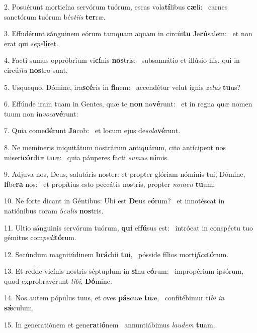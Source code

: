 2. Posuérunt morticína servórum tuórum, escas vola\textbf{tí}libus \textbf{cæ}li: \ast\  carnes sanctórum tuórum bés\textit{ti}\textit{is} \textbf{ter}ræ.\

3. Effudérunt sánguinem eórum tamquam aquam in circúi\textbf{tu} Je\textbf{rú}salem: \ast\  et non erat qui \textit{se}\textit{pe}\textbf{lí}ret.\

4. Facti sumus oppróbrium vi\textbf{cí}nis \textbf{nos}tris: \ast\  subsannátio et illúsio his, qui in circú\textit{i}\textit{tu} \textbf{nos}tro sunt.\

5. Usquequo, Dómine, ira\textbf{scé}ris in \textbf{fi}nem: \ast\  accendétur velut ignis \textit{ze}\textit{lus} \textbf{tu}us?\

6. Effúnde iram tuam in Gentes, quæ te \textbf{non} no\textbf{vé}runt: \ast\  et in regna quæ nomen tuum non in\textit{vo}\textit{ca}\textbf{vé}runt:\

7. Quia come\textbf{dé}runt \textbf{Ja}cob: \ast\  et locum ejus de\textit{so}\textit{la}\textbf{vé}runt.\

8. Ne memíneris iniquitátum nostrárum antiquárum, cito antícipent nos miseri\textbf{cór}diæ \textbf{tu}æ: \ast\  quia páuperes facti \textit{su}\textit{mus} \textbf{ni}mis.\

9. Adjuva nos, Deus, salutáris noster: et propter glóriam nóminis tui, Dómine, \textbf{lí}be\textbf{ra} nos: \ast\  et propítius esto peccátis nostris, propter \textit{no}\textit{men} \textbf{tu}um:\

10. Ne forte dicant in Géntibus: Ubi est \textbf{De}us e\textbf{ó}rum? \ast\  et innotéscat in natiónibus coram ó\textit{cu}\textit{lis} \textbf{nos}tris.\

11. Ultio sánguinis servórum tuórum, \textbf{qui} ef\textbf{fú}sus est: \ast\  intróeat in conspéctu tuo gémitus com\textit{pe}\textit{di}\textbf{tó}rum.\

12. Secúndum magnitúdinem \textbf{brá}chii \textbf{tu}i, \ast\  pósside fílios morti\textit{fi}\textit{ca}\textbf{tó}rum.\

13. Et redde vicínis nostris séptuplum in \textbf{si}nu e\textbf{ó}rum: \ast\  impropérium ipsórum, quod exprobravérunt \textit{ti}\textit{bi}, \textbf{Dó}mine.\

14. Nos autem pópulus tuus, et oves \textbf{pás}cuæ \textbf{tu}æ, \ast\  confitébimur ti\textit{bi} \textit{in} \textbf{sǽ}culum.\

15. In generatiónem et gene\textbf{ra}ti\textbf{ó}nem \ast\  annuntiábimus \textit{lau}\textit{dem} \textbf{tu}am.\


